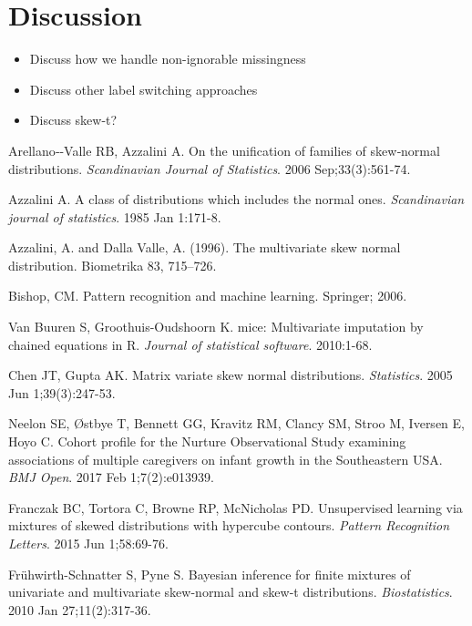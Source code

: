 \documentclass[useAMS,referee]{biom}
\begin{document}
\newpage

\section{Discussion}
\label{s:discuss}


\begin{itemize}

\item Discuss how we handle non-ignorable missingness 

\item Discuss other label switching approaches

\item Discuss skew-t?

\end{itemize}

\begin{thebibliography}{}

\bibitem{ } Arellano‐-Valle RB, Azzalini A. On the unification of families of skew‐normal distributions. \textit{Scandinavian Journal of Statistics}. 2006 Sep;33(3):561-74.

\bibitem{ } Azzalini A. A class of distributions which includes the normal ones. \textit{Scandinavian journal of statistics}. 1985 Jan 1:171-8.

\bibitem{ } Azzalini, A. and Dalla Valle, A. (1996). The multivariate skew normal distribution. Biometrika 83, 715–726.

\bibitem{ } Bishop, CM. Pattern recognition and machine learning. Springer; 2006.

\bibitem{ } Van Buuren S, Groothuis-Oudshoorn K. mice: Multivariate imputation by chained equations in R. \textit{Journal of statistical software}. 2010:1-68.

\bibitem{ } Chen JT, Gupta AK. Matrix variate skew normal distributions. \textit{Statistics}. 2005 Jun 1;39(3):247-53.

\bibitem{ } Neelon SE, \O stbye T, Bennett GG, Kravitz RM, Clancy SM, Stroo M, Iversen E, Hoyo C. Cohort profile for the Nurture Observational Study examining associations of multiple caregivers on infant growth in the Southeastern USA. \textit{BMJ Open}. 2017 Feb 1;7(2):e013939.

\bibitem{ } Franczak BC, Tortora C, Browne RP, McNicholas PD. Unsupervised learning via mixtures of skewed distributions with hypercube contours. \textit{Pattern Recognition Letters}. 2015 Jun 1;58:69-76.

\bibitem{ } Fr\"{u}hwirth-Schnatter S, Pyne S. Bayesian inference for finite mixtures of univariate and multivariate skew-normal and skew-t distributions. \textit{Biostatistics}. 2010 Jan 27;11(2):317-36.


\end{thebibliography}
\end{document}
